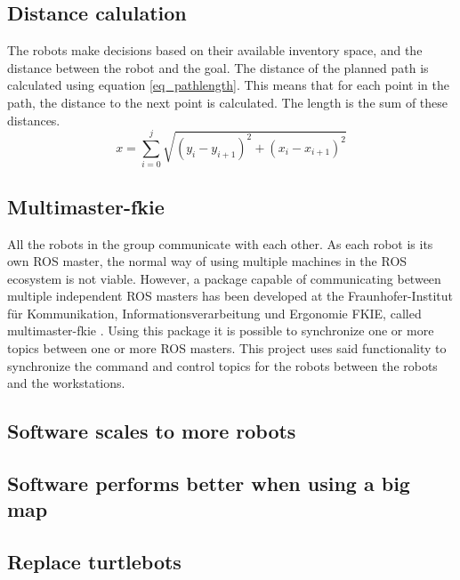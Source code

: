 \documentclass[10pt, journal]{IEEEtran}
\begin{document}
\subsection{Distance calulation}
The robots make decisions based on their available inventory space, and the distance between the robot and the goal. The distance of the planned path is calculated using equation \ref{eq_pathlength}. This means that for each point in the path, the distance to the next point is calculated. The length is the sum of these distances.
\begin{equation}
\label{eq_pathlength}
x = \sum\limits_{i=0}^j \sqrt{(y_i - y_{i+1})^2 + (x_i - x_{i+1})^2}
\end{equation}

\subsection{Multimaster-fkie}
All the robots in the group communicate with each other. As each robot is its own ROS master, the normal\cite{ROSMultipleMachines} way of using multiple machines in the ROS ecosystem is not viable. However, a package capable of communicating between multiple independent ROS masters has been developed at the Fraunhofer-Institut für Kommunikation, Informationsverarbeitung und Ergonomie FKIE, called multimaster-fkie \cite{Multimaster-fkie}. Using this package it is possible to synchronize one or more topics between one or more ROS masters. This project uses said functionality to synchronize the command and control topics for the robots between the robots and the workstations.
\subsection{Software scales to more robots}
\lipsum[13-14]
\subsection{Software performs better when using a big map}
\lipsum[15-16]
\subsection{Replace turtlebots}
\lipsum[10-11]



\end{document}
